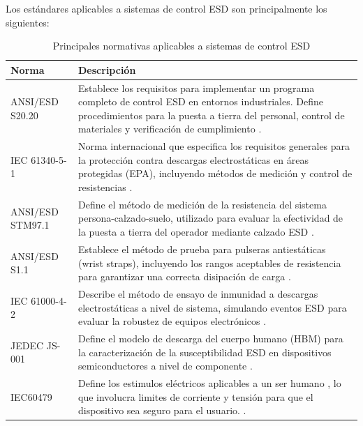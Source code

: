         Los estándares aplicables a sistemas de control ESD son principalmente los siguientes:
        \begin{table}[H]
        \centering
        \caption{Principales normativas aplicables a sistemas de control ESD}
        \begin{tabular}{|l|p{10cm}|}
        \hline
        \textbf{Norma} & \textbf{Descripción} \\
            \hline

            ANSI/ESD S20.20 &
            Establece los requisitos para implementar un programa completo 
            de control ESD en entornos industriales. 
            Define procedimientos para la puesta a tierra del personal, 
            control de materiales y verificación de cumplimiento \cite{ANSI_S2020_Blog}. \\
            \hline

            IEC 61340-5-1 &
            Norma internacional que especifica los requisitos generales 
            para la protección contra descargas electrostáticas en áreas 
            protegidas (EPA), incluyendo métodos de medición 
            y control de resistencias \cite{IEC61340_Preview}. \\
            \hline

            ANSI/ESD STM97.1 &
            Define el método de medición de la resistencia del sistema 
            persona-calzado-suelo, utilizado para evaluar la efectividad 
            de la puesta a tierra del operador mediante calzado ESD \cite{STM97_ANSI}. \\
            \hline

            ANSI/ESD S1.1 &
            Establece el método de prueba para pulseras antiestáticas 
            (wrist straps), incluyendo los rangos aceptables de resistencia 
            para garantizar una correcta disipación de carga \cite{S1_1_ANSI}. \\
            \hline

            IEC 61000-4-2 &
            Describe el método de ensayo de inmunidad a descargas 
            electrostáticas a nivel de sistema, simulando eventos ESD 
            para evaluar la robustez de equipos electrónicos \cite{IEC61000_ITU}. \\
            \hline

            JEDEC JS-001 &
            Define el modelo de descarga del cuerpo humano (HBM) 
            para la caracterización de la susceptibilidad ESD 
            en dispositivos semiconductores a nivel de componente \cite{JEDEC_JTR001}. \\
            \hline

            IEC60479 &
            Define los estimulos eléctricos aplicables a un ser humano
            , lo que involucra limites de corriente y tensión para que 
            el dispositivo sea seguro para el usuario. \cite{IEC60479}. \\
            \hline

        \end{tabular}
        \label{tab:esd_normas}
        \end{table}

